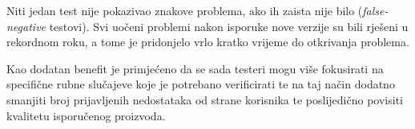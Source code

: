     
Niti jedan test nije pokazivao znakove problema, ako ih zaista nije bilo (\emph{false-negative} testovi).
Svi uočeni problemi nakon isporuke nove verzije su bili rješeni u rekordnom roku, a tome je pridonjelo vrlo kratko vrijeme do otkrivanja problema.

Kao dodatan benefit je primjećeno da se sada testeri mogu više fokusirati na specifične rubne slučajeve koje je potrebano verificirati te na taj način dodatno smanjiti broj prijavljenih nedostataka od strane korisnika te poslijedično povisiti kvalitetu isporučenog proizvoda.
